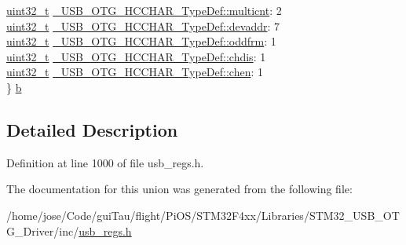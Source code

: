 \begin{DoxyCompactItemize}
\begin{tabbing}
\>\hyperlink{stdint_8h_a435d1572bf3f880d55459d9805097f62}{uint32\_t} \hyperlink{group___u_s_b___o_t_g___d_r_i_v_e_r_ga26e4da68bd807a1a39feacaa0bdb550a}{\_USB\_OTG\_HCCHAR\_TypeDef::multicnt}: 2\\
\>\hyperlink{stdint_8h_a435d1572bf3f880d55459d9805097f62}{uint32\_t} \hyperlink{group___u_s_b___o_t_g___d_r_i_v_e_r_ga920950b9ba271e9946f53170718fef00}{\_USB\_OTG\_HCCHAR\_TypeDef::devaddr}: 7\\
\>\hyperlink{stdint_8h_a435d1572bf3f880d55459d9805097f62}{uint32\_t} \hyperlink{group___u_s_b___o_t_g___d_r_i_v_e_r_gac32b5a32fe881b0a669794c7a78665ed}{\_USB\_OTG\_HCCHAR\_TypeDef::oddfrm}: 1\\
\>\hyperlink{stdint_8h_a435d1572bf3f880d55459d9805097f62}{uint32\_t} \hyperlink{group___u_s_b___o_t_g___d_r_i_v_e_r_gaac1a578fcf20348513071fa7d0aa886e}{\_USB\_OTG\_HCCHAR\_TypeDef::chdis}: 1\\
\>\hyperlink{stdint_8h_a435d1572bf3f880d55459d9805097f62}{uint32\_t} \hyperlink{group___u_s_b___o_t_g___d_r_i_v_e_r_ga11ea8f2d005f00de5417dd32e602ac59}{\_USB\_OTG\_HCCHAR\_TypeDef::chen}: 1\\
\} \hyperlink{group___u_s_b___o_t_g___d_r_i_v_e_r_gac2b229bd489330ca4974729b03a00a40}{b}\\

\end{tabbing}\end{DoxyCompactItemize}


\subsection{Detailed Description}


Definition at line 1000 of file usb\-\_\-regs.\-h.



The documentation for this union was generated from the following file\-:\begin{DoxyCompactItemize}
\item 
/home/jose/\-Code/gui\-Tau/flight/\-Pi\-O\-S/\-S\-T\-M32\-F4xx/\-Libraries/\-S\-T\-M32\-\_\-\-U\-S\-B\-\_\-\-O\-T\-G\-\_\-\-Driver/inc/\hyperlink{_s_t_m32_f4xx_2_libraries_2_s_t_m32___u_s_b___o_t_g___driver_2inc_2usb__regs_8h}{usb\-\_\-regs.\-h}\end{DoxyCompactItemize}
